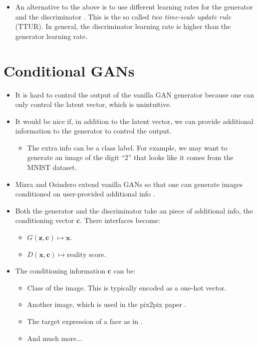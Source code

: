 \documentclass[10pt]{article}
\newcommand{\ve}[1]{\pmb{#1}}
\begin{document}
\begin{itemize}
\begin{itemize}
     	\item An alternative to the above is to use different learning rates for the generator and the discriminator \cite{Heusel:2017}. This is the so called \emph{two time-scale update rule} (TTUR). In general, the discriminator learning rate is higher than the generator learning rate.
     \end{itemize} 
  \end{itemize}

  \section{Conditional GANs}

  \begin{itemize}  
  	\item It is hard to control the output of the vanilla GAN generator because one can only control the latent vector, which is unintuitive.

  	\item It would be nice if, in addition to the latent vector, we can provide additional information to the generator to control the output.
  	\begin{itemize}
  		\item The extra info can be a class label. For example, we may want to generate an image of the digit ``2'' that looks like it comes from the MNIST dataset.
  	\end{itemize}

  	\item Mizra and Osindero extend vanilla GANs so that one can generate images conditioned on user-provided additional info \cite{Mizra:2014}.

    \item Both the generator and the discriminator take an piece of additional info, the conditioning vector $\ve{c}$. There interfaces become:
    \begin{itemize}
      \item $G(\ve{z}, \ve{c}) \mapsto \ve{x}$.
      \item $D(\ve{x}, \ve{c}) \mapsto \mbox{reality score}$.
    \end{itemize}

    \item The conditioning information $\ve{c}$ can be:
    \begin{itemize}
      \item Class of the image. This is typically encoded as a one-hot vector.
      \item Another image, which is used in the pix2pix paper \cite{Isola:2016}.
      \item The target expression of a face as in \cite{Pumarola:2018}.
      \item And much more...    
    \end{itemize}


\end{itemize}
\end{document}
